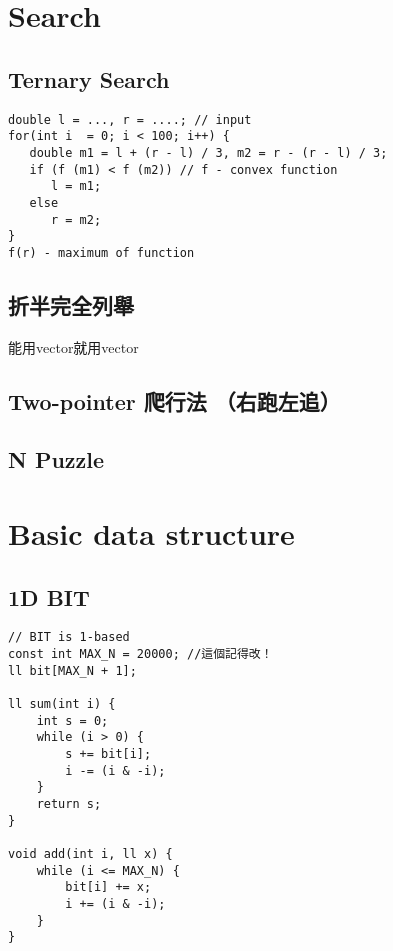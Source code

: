 \documentclass[10pt,oneside]{article}
\begin{document}
\begin{landscape}
\begin{multicols}{2}

\section{Search}

\subsection{Ternary Search}

\begin{lstlisting}
double l = ..., r = ....; // input
for(int i  = 0; i < 100; i++) {
   double m1 = l + (r - l) / 3, m2 = r - (r - l) / 3;
   if (f (m1) < f (m2)) // f - convex function
      l = m1;
   else
      r = m2;
}
f(r) - maximum of function
\end{lstlisting}

\subsection{折半完全列舉}

能用vector就用vector

\subsection{Two-pointer 爬行法 （右跑左追）}

\subsection{N Puzzle}




\section{Basic data structure}

\subsection{1D BIT}

\begin{lstlisting}
// BIT is 1-based
const int MAX_N = 20000; //這個記得改！
ll bit[MAX_N + 1];

ll sum(int i) {
    int s = 0;
    while (i > 0) {
        s += bit[i];
        i -= (i & -i);
    }
    return s;
}

void add(int i, ll x) {
    while (i <= MAX_N) {
        bit[i] += x;
        i += (i & -i);
    }
}
\end{lstlisting}


\end{multicols}
\end{landscape}
\end{document}
